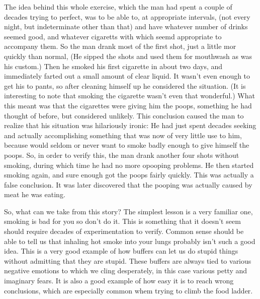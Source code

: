 \documentclass[12pt,letterpaper]{book}
\begin{document}
The idea behind this whole exercise, which the man had spent a couple of decades trying to perfect, was to be able to, at appropriate intervals, (not every night, but indeterminate other than that) and have whatever number of drinks seemed good, and whatever cigaretts with which seemd appropriate to accompany them. So the man drank most of the first shot, just a little mor quickly than normal, (He sipped the shots and used them for mouthwash as was his custom.) Then he smoked his first cigarette in about two days, and immediately farted out a small amount of clear liquid. It wasn't even enough to get his to pants, so after cleaning himself up he considered the situation. (It is interesting to note that smoking the cigarette wasn't even that wonderful.) What this meant was that the cigarettes were giving him the poops, something he had thought of before, but considered unlikely. This conclusion caused the man to realize that his situation was hilariously ironic: He had just spent decades seeking and actually accomplishing something that was now of very little use to him, because would seldom or never want to smoke badly enough to give himself the poops. So, in order to verify this, the man drank another four shots without smoking, during which time he had no more opooping problems. He then started smoking again, and sure enough got the poops fairly quickly. This was actually a false conclusion. It was later discovered that the pooping was actually caused by meat he was eating.

So, what can we take from this story? The simplest lesson is a very familiar one, smoking is bad for you so don't do it. This is something that it doesn't seem should require decades of experimentation to verify. Common sense should be able to tell us that inhaling hot smoke into your lungs probably isn't such a good idea. This is a very good example of how buffers can let us do stupid things without admitting that they are stupid. These buffers are always tied to various negative emotions to which we cling desperately, in this case various petty and imaginary fears. It is also a good example of how easy it is to reach wrong conclusions, which are especially common whem trying to climb the food ladder.
\end{document}
